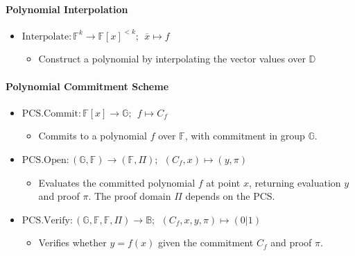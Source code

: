 \documentclass[
]{article}
\providecommand{\tightlist}{%
  \setlength{\itemsep}{0pt}\setlength{\parskip}{0pt}}
\begin{document}
\paragraph{Polynomial Interpolation}\label{polynomial-interpolation}

\begin{itemize}
\tightlist
\item
  \(\text{Interpolate}: \mathbb{F}^k \to \mathbb{F}[x]^{< k};\ \ \overline{x} \mapsto f\)

  \begin{itemize}
  \tightlist
  \item
    Construct a polynomial by interpolating the vector values over
    \(\mathbb{D}\)
  \end{itemize}
\end{itemize}

\paragraph{Polynomial Commitment
Scheme}\label{polynomial-commitment-scheme}

\begin{itemize}
\tightlist
\item
  \(\text{PCS.Commit}: \mathbb{F}[x] \to \mathbb{G};\ \ f \mapsto C_f\)

  \begin{itemize}
  \tightlist
  \item
    Commits to a polynomial \(f\) over \(\mathbb{F}\), with commitment
    in group \(\mathbb{G}\).
  \end{itemize}
\item
  \(\text{PCS.Open}: (\mathbb{G}, \mathbb{F}) \to (\mathbb{F}, \Pi);\ \ (C_f, x) \mapsto (y,\pi)\)

  \begin{itemize}
  \tightlist
  \item
    Evaluates the committed polynomial \(f\) at point \(x\), returning
    evaluation \(y\) and proof \(\pi\). The proof domain \(\Pi\) depends
    on the PCS.
  \end{itemize}
\item
  \(\text{PCS.Verify}: (\mathbb{G}, \mathbb{F}, \mathbb{F}, \Pi) \to \mathbb{B};\ \ (C_f,x,y ,\pi) \mapsto (0|1)\)

  \begin{itemize}
  \tightlist
  \item
    Verifies whether \(y = f(x)\) given the commitment \(C_f\) and proof
    \(\pi\).
  \end{itemize}
\end{itemize}
\end{document}

